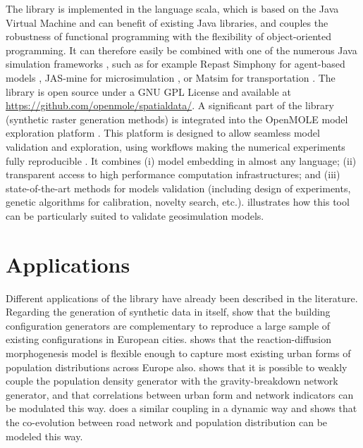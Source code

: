 \documentclass[11pt]{article}
\begin{document}
The library is implemented in the language scala, which is based on the Java Virtual Machine and can benefit of existing Java libraries, and couples the robustness of functional programming with the flexibility of object-oriented programming. It can therefore easily be combined with one of the numerous Java simulation frameworks \citep{nikolai2009tools}, such as for example Repast Simphony for agent-based models \citep{north2013complex}, JAS-mine for microsimulation \citep{richiardi2017jas}, or Matsim for transportation \citep{horni2016multi}. The library is open source under a GNU GPL License and available at \url{https://github.com/openmole/spatialdata/}. A significant part of the library (synthetic raster generation methods) is integrated into the OpenMOLE model exploration platform \citep{reuillon2013openmole}. This platform is designed to allow seamless model validation and exploration, using workflows making the numerical experiments fully reproducible \citep{passerat2017reproducible}. It combines (i) model embedding in almost any language; (ii) transparent access to high performance computation infrastructures; and (iii) state-of-the-art methods for models validation (including design of experiments, genetic algorithms for calibration, novelty search, etc.). \cite{reuillon2019fostering} illustrates how this tool can be particularly suited to validate geosimulation models.


\section{Applications}

Different applications of the library have already been described in the literature. Regarding the generation of synthetic data in itself, \cite{doi:10.1162/isala00159} show that the building configuration generators are complementary to reproduce a large sample of existing configurations in European cities. \cite{raimbault2018calibration} shows that the reaction-diffusion morphogenesis model is flexible enough to capture most existing urban forms of population distributions across Europe also. \cite{raimbault2019second} shows that it is possible to weakly couple the population density generator with the gravity-breakdown network generator, and that correlations between urban form and network indicators can be modulated this way. \cite{raimbault2019urban} does a similar coupling in a dynamic way and shows that the co-evolution between road network and population distribution can be modeled this way.
\end{document}
